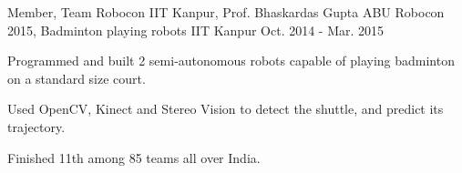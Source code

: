 \begin{cventries}

  \cventry
  {Member, Team Robocon IIT Kanpur, Prof. Bhaskardas Gupta}
  {ABU Robocon 2015, Badminton playing robots}
  {IIT Kanpur}
  {Oct. 2014 - Mar. 2015}
  {
    \begin{cvitems}
    \item Programmed and built 2 semi-autonomous robots
      capable of playing badminton on a standard size court.
    \item Used OpenCV, Kinect and Stereo Vision to detect the shuttle,
      and predict its trajectory.
    \item Finished 11th among 85 teams all over India.
    \end{cvitems}
  }

\end{cventries}

